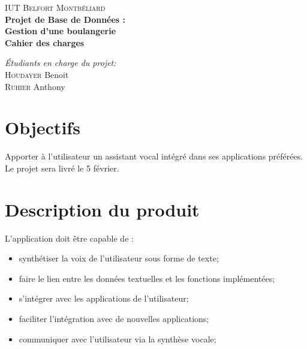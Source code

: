 \documentclass[12pt]{article}
\begin{document}
\begin{titlepage}
\begin{center}

\textsc{\LARGE IUT Belfort Montbéliard}\\[4cm]

{ \huge \bfseries Projet de Base de Données :\\[0.3em] Gestion d'une boulangerie\\[1em]Cahier des charges}\\[4cm]

{
\begin{large}
\setlength{\baselineskip}{1.6\baselineskip}
\emph{Étudiants en charge du projet: \\[0.5em]}
\textsc{Houdayer} Benoit\\
\textsc{Ruhier} Anthony\\[2em]

\end{large}
}

\vfill

\end{center}
\end{titlepage}


	\section{Objectifs}

Apporter à l'utilisateur un assistant vocal intégré dans ses applications
préférées. Le projet sera livré le 5 février.

	\section{Description du produit}

L'application doit être capable de :
\begin{itemize}
    \item synthétiser la voix de l'utilisateur sous forme de texte;
    \item faire le lien entre les données textuelles et les fonctions
        implémentées;
    \item s'intégrer avec les applications de l'utilisateur;
    \item faciliter l'intégration avec de nouvelles applications;
    \item communiquer avec l'utilisateur via la synthèse vocale;
\end{itemize}
\end{document}
